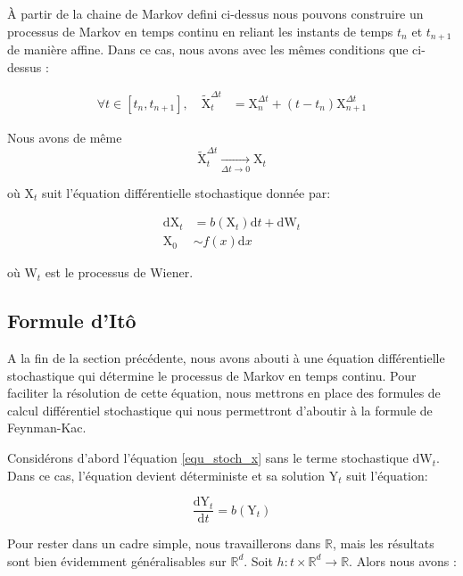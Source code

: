 \documentclass[11pt]{article}
\theoremstyle{definition}
\theoremstyle{remark}
\begin{document}
À partir de la chaine de Markov defini ci-dessus nous pouvons construire un processus de Markov en temps continu en reliant les instants de temps $t_n$ et $t_{n+1}$ de manière affine. Dans ce cas, nous avons avec les mêmes conditions que ci-dessus :

\begin{align}
\forall t \in [t_n,t_{n+1}],\quad\tilde{\mathrm{X}}_{t}^{\Delta t} &= \mathrm{X}_{n}^{\Delta t} + (t-t_n) \mathrm{X}_{n+1}^{\Delta t} 
\end{align}

Nous avons de même 
\begin{equation}
\tilde{\mathrm{X}}_{t}^{\Delta t} \underset{\Delta t \to 0}{\longrightarrow} \mathrm{X}_t
\end{equation}


où $\mathrm{X}_{t}$ suit l’équation différentielle stochastique donnée par: 

\begin{align}
\label{equ_stoch_x}
\mathrm{dX}_{t} &= b(\mathrm{X}_{t})\mathrm{d}t + \mathrm{dW}_{t} \\
\mathrm{X}_{0} &\sim f(x)\mathrm{d}x
\end{align}

où $\mathrm{W}_{t}$ est le processus de Wiener.

\subsection{Formule d'Itô}

A la fin de la section précédente, nous avons abouti à une équation différentielle stochastique qui détermine le processus de Markov en temps continu. Pour faciliter la résolution de cette équation, nous  mettrons en place des formules de calcul différentiel stochastique qui nous permettront d'aboutir à la formule de Feynman-Kac. 

Considérons d'abord l’équation \eqref{equ_stoch_x} sans le terme stochastique $\mathrm{dW}_{t}$. Dans ce cas, l'équation devient déterministe et sa solution $\mathrm{Y}_t$ suit l'équation:

\begin{equation}
\frac{\mathrm{dY}_{t}}{\mathrm{d}t} = b(\mathrm{Y}_t) 
\end{equation}

Pour rester dans un cadre simple, nous travaillerons dans $\mathbb{R}$, mais les résultats sont bien évidemment généralisables sur $\mathbb{R}^d$. Soit $h: t \times \mathbb{R}^d \rightarrow \mathbb{R}$. Alors nous avons : 
\end{document}
